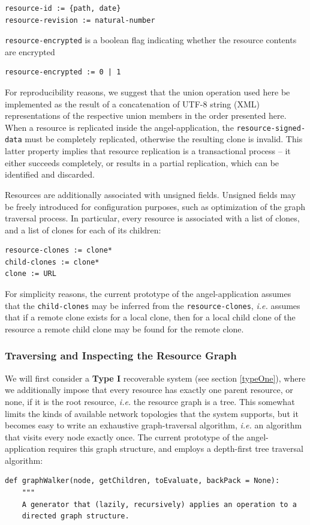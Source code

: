\documentclass[11pt]{article}
\begin{document}
\begin{mainmatter}
\begin{verbatim}
resource-id := {path, date}
resource-revision := natural-number
\end{verbatim} 
\texttt{resource-encrypted} is a boolean flag indicating whether the resource contents are encrypted
\begin{verbatim}
resource-encrypted := 0 | 1
\end{verbatim}
For reproducibility reasons, we suggest that the union operation used here be implemented as the result of a concatenation of UTF-8 string (XML) representations of the respective union members in the order presented here. When a resource is replicated inside the angel-application, the \texttt{resource-signed-data} must be completely replicated, otherwise the resulting clone is invalid. This latter property implies that resource replication is a transactional process -- it either succeeds completely, or results in a partial replication, which can be identified and discarded. \label{transaction}

Resources are additionally associated with unsigned fields. Unsigned fields may be freely introduced for configuration purposes, such as optimization of the graph traversal process. In particular, every resource is associated with a list of clones, and a list of clones for each of its children:
\begin{verbatim}
resource-clones := clone*
child-clones := clone*
clone := URL
\end{verbatim}
For simplicity reasons, the current prototype of the angel-application assumes that the \texttt{child-clones} may be inferred from the \texttt{resource-clones}, \emph{i.e.} assumes that if a remote clone exists for a local clone, then for a local child clone of the resource a remote child clone may be found for the remote clone.

\subsubsection{Traversing and Inspecting the Resource Graph}
\label{traverse}
We will first consider a \textbf{Type I} recoverable system (see section \ref{typeOne}), where we additionally impose that every resource has exactly one parent resource, or none, if it is the root resource, \emph{i.e.} the resource graph is a tree. This somewhat limits the kinds of available network topologies that the system supports, but it becomes easy to write an exhaustive graph-traversal algorithm, \emph{i.e.} an algorithm that visits every node exactly once. The current prototype of the angel-application requires this graph structure, and employs a depth-first tree traversal algorithm:
\begin{verbatim}
def graphWalker(node, getChildren, toEvaluate, backPack = None):
    """
    A generator that (lazily, recursively) applies an operation to a 
    directed graph structure.
    

\end{verbatim}
\end{mainmatter}
\end{document}
